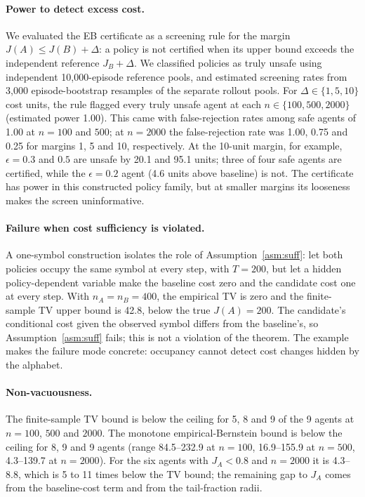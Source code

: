 \documentclass{article}
\begin{document}
\paragraph{Power to detect excess cost.} We evaluated the EB certificate as a screening rule for the margin $J(A)\le J(B)+\Delta$: a policy is not certified when its upper bound exceeds the independent reference $J_B+\Delta$. We classified policies as truly unsafe using independent 10,000-episode reference pools, and estimated screening rates from 3,000 episode-bootstrap resamples of the separate rollout pools. For $\Delta\in\{1,5,10\}$ cost units, the rule flagged every truly unsafe agent at each $n\in\{100,500,2000\}$ (estimated power 1.00). This came with false-rejection rates among safe agents of 1.00 at $n=100$ and $500$; at $n=2000$ the false-rejection rate was 1.00, 0.75 and 0.25 for margins 1, 5 and 10, respectively. At the 10-unit margin, for example, $\epsilon=0.3$ and $0.5$ are unsafe by 20.1 and 95.1 units; three of four safe agents are certified, while the $\epsilon=0.2$ agent (4.6 units above baseline) is not. The certificate has power in this constructed policy family, but at smaller margins its looseness makes the screen uninformative.

\paragraph{Failure when cost sufficiency is violated.} A one-symbol construction isolates the role of Assumption~\ref{asm:suff}: let both policies occupy the same symbol at every step, with $T=200$, but let a hidden policy-dependent variable make the baseline cost zero and the candidate cost one at every step. With $n_A=n_B=400$, the empirical TV is zero and the finite-sample TV upper bound is 42.8, below the true $J(A)=200$. The candidate's conditional cost given the observed symbol differs from the baseline's, so Assumption~\ref{asm:suff} fails; this is not a violation of the theorem. The example makes the failure mode concrete: occupancy cannot detect cost changes hidden by the alphabet.

\paragraph{Non-vacuousness.} The finite-sample TV bound is below the ceiling for 5, 8 and 9 of the 9 agents at $n=100$, $500$ and $2000$. The monotone empirical-Bernstein bound is below the ceiling for 8, 9 and 9 agents (range 84.5--232.9 at $n=100$, 16.9--155.9 at $n=500$, 4.3--139.7 at $n=2000$). For the six agents with $J_A<0.8$ and $n=2000$ it is 4.3--8.8, which is 5 to 11 times below the TV bound; the remaining gap to $J_A$ comes from the baseline-cost term and from the tail-fraction radii.
\end{document}
